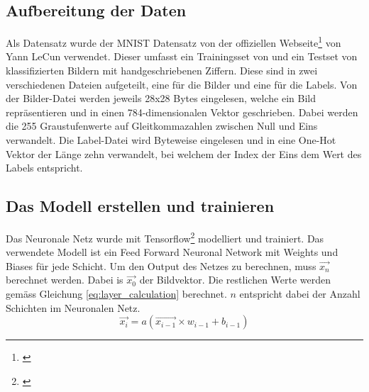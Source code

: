 \documentclass[Interploate_hadwritten_Digits.tex]{subfiles}
\begin{document}
	\subsection{Aufbereitung der Daten}
	Als Datensatz wurde der MNIST Datensatz von der offiziellen Webseite\footnote{\cite{lecun-mnist}} von Yann LeCun verwendet. Dieser umfasst ein Trainingsset von  und ein Testset von  klassifizierten Bildern mit handgeschriebenen Ziffern. Diese sind in zwei verschiedenen Dateien aufgeteilt, eine für die Bilder und eine für die Labels. Von der Bilder-Datei werden jeweils 28x28 Bytes eingelesen, welche ein Bild repräsentieren und in einen 784-dimensionalen Vektor geschrieben. Dabei werden die 255 Graustufenwerte auf Gleitkommazahlen zwischen Null und Eins verwandelt. Die Label-Datei wird Byteweise eingelesen und in eine One-Hot Vektor der Länge zehn verwandelt, bei welchem der Index der Eins dem Wert des Labels entspricht.
	
	\subsection{Das Modell erstellen und trainieren}
	Das Neuronale Netz wurde mit Tensorflow\footnote{\cite{tensorflow}} modelliert und trainiert. Das verwendete Modell ist ein Feed Forward Neuronal Network mit Weights und Biases für jede Schicht. Um den Output des Netzes zu berechnen, muss $ \vec{x_{n}} $ berechnet werden. Dabei is $ \vec{x_{0}} $ der Bildvektor. Die restlichen Werte werden gemäss Gleichung \ref{eq:layer_calculation} berechnet. $ n $ entspricht dabei der Anzahl Schichten im Neuronalen Netz.
	\begin{equation}
	\vec{x_{i}} = a(\vec{x_{i-1}} \times w_{i-1} + b_{i-1})
	\label{eq:layer_calculation}
	\end{equation}
	
\end{document}
